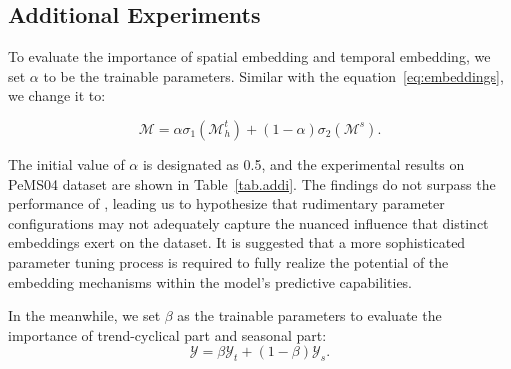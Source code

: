 \subsection{Additional Experiments}
To evaluate the importance of spatial embedding and temporal embedding, we set $\alpha$ to be the trainable parameters. Similar with the equation~\ref{eq:embeddings}, we change it to:

\begin{equation}
    \bm{\mathcal{M}} = \alpha\sigma_{1}(\bm{\mathcal{M}}^{t}_{h}) + (1-\alpha)\sigma_{2}(\bm{\mathcal{M}}^{s}).
\end{equation}

The initial value of $\alpha$ is designated as 0.5, and the experimental results on PeMS04 dataset are shown in Table~\ref{tab.addi}. The findings do not surpass the performance of \model, leading us to hypothesize that rudimentary parameter configurations may not adequately capture the nuanced influence that distinct embeddings exert on the dataset. It is suggested that a more sophisticated parameter tuning process is required to fully realize the potential of the embedding mechanisms within the model's predictive capabilities.

In the meanwhile, we set $\beta$ as the trainable parameters to evaluate the importance of trend-cyclical part and seasonal part:
\begin{equation}
    \bm{\mathcal{Y}} = \beta\bm{\mathcal{Y}}_{t} + (1-\beta)\bm{\mathcal{Y}}_{s}.
\end{equation}


